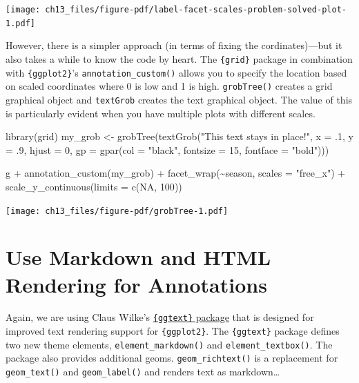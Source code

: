 \documentclass[
  letterpaper,
]{scrbook}
\newenvironment{Shaded}{\begin{snugshade}}{\end{snugshade}}
\newcommand{\AttributeTok}[1]{\textcolor[rgb]{0.40,0.45,0.13}{#1}}
\newcommand{\ConstantTok}[1]{\textcolor[rgb]{0.56,0.35,0.01}{#1}}
\newcommand{\DecValTok}[1]{\textcolor[rgb]{0.68,0.00,0.00}{#1}}
\newcommand{\FunctionTok}[1]{\textcolor[rgb]{0.28,0.35,0.67}{#1}}
\newcommand{\NormalTok}[1]{\textcolor[rgb]{0.00,0.23,0.31}{#1}}
\newcommand{\OtherTok}[1]{\textcolor[rgb]{0.00,0.23,0.31}{#1}}
\newcommand{\SpecialCharTok}[1]{\textcolor[rgb]{0.37,0.37,0.37}{#1}}
\newcommand{\StringTok}[1]{\textcolor[rgb]{0.13,0.47,0.30}{#1}}
\begin{document}
\texttt{[image: ch13\_files/figure-pdf/label-facet-scales-problem-solved-plot-1.pdf]}

However, there is a simpler approach (in terms of fixing the
cordinates)---but it also takes a while to know the code by heart. The
\texttt{\{grid\}} package in combination with \texttt{\{ggplot2\}}'s
\texttt{annotation\_custom()} allows you to specify the location based
on scaled coordinates where 0 is low and 1 is high. \texttt{grobTree()}
creates a grid graphical object and \texttt{textGrob} creates the text
graphical object. The value of this is particularly evident when you
have multiple plots with different scales.

\begin{Shaded}
\begin{Highlighting}[]
\FunctionTok{library}\NormalTok{(grid)}
\NormalTok{my\_grob }\OtherTok{\textless{}{-}} \FunctionTok{grobTree}\NormalTok{(}\FunctionTok{textGrob}\NormalTok{(}\StringTok{"This text stays in place!"}\NormalTok{,}
                             \AttributeTok{x =}\NormalTok{ .}\DecValTok{1}\NormalTok{, }\AttributeTok{y =}\NormalTok{ .}\DecValTok{9}\NormalTok{, }\AttributeTok{hjust =} \DecValTok{0}\NormalTok{,}
                             \AttributeTok{gp =} \FunctionTok{gpar}\NormalTok{(}\AttributeTok{col =} \StringTok{"black"}\NormalTok{,}
                                       \AttributeTok{fontsize =} \DecValTok{15}\NormalTok{,}
                                       \AttributeTok{fontface =} \StringTok{"bold"}\NormalTok{)))}

\NormalTok{g }\SpecialCharTok{+}
  \FunctionTok{annotation\_custom}\NormalTok{(my\_grob) }\SpecialCharTok{+}
  \FunctionTok{facet\_wrap}\NormalTok{(}\SpecialCharTok{\textasciitilde{}}\NormalTok{season, }\AttributeTok{scales =} \StringTok{"free\_x"}\NormalTok{) }\SpecialCharTok{+}
  \FunctionTok{scale\_y\_continuous}\NormalTok{(}\AttributeTok{limits =} \FunctionTok{c}\NormalTok{(}\ConstantTok{NA}\NormalTok{, }\DecValTok{100}\NormalTok{))}
\end{Highlighting}
\end{Shaded}

\texttt{[image: ch13\_files/figure-pdf/grobTree-1.pdf]}

\section{Use Markdown and HTML Rendering for
Annotations}\label{use-markdown-and-html-rendering-for-annotations}

Again, we are using Claus Wilke's
\href{https://wilkelab.org/ggtext/}{\texttt{\{ggtext\}} package} that is
designed for improved text rendering support for \texttt{\{ggplot2\}}.
The \texttt{\{ggtext\}} package defines two new theme elements,
\texttt{element\_markdown()} and \texttt{element\_textbox()}. The
package also provides additional geoms. \texttt{geom\_richtext()} is a
replacement for \texttt{geom\_text()} and \texttt{geom\_label()} and
renders text as markdown\ldots{}
\end{document}
